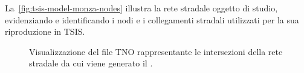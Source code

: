 La~\vref{fig:tsis-model-monza-nodes} illustra la rete stradale oggetto di studio, evidenziando e identificando i nodi e i collegamenti stradali utilizzati per la sua riproduzione in \acs{TSIS}.
\begin{figure}
  \centering
  \captionsetup[subfigure]{labelformat=empty}
  \label{fig:tsis-model-monza-nodes}
\end{figure}
\begin{figure}
  \centering
  \captionsetup{type=figure}
  \captionsetup[subfigure]{labelformat=empty}
  \caption[Intersezioni della rete stradale del ]{Visualizzazione del file \acs{TNO} rappresentante le intersezioni della rete stradale da cui viene generato il .}
\end{figure}

